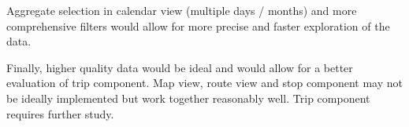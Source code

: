 \documentclass[journal]{vgtc}                %
\begin{document}
Aggregate selection in calendar view (multiple days / months) and more comprehensive filters would allow for more precise and faster exploration of the data.

Finally, higher quality data would be ideal and would allow for a better evaluation of trip component. Map view, route view and stop component may not be ideally implemented but work together reasonably well. Trip component requires further study.



%

\end{document}
